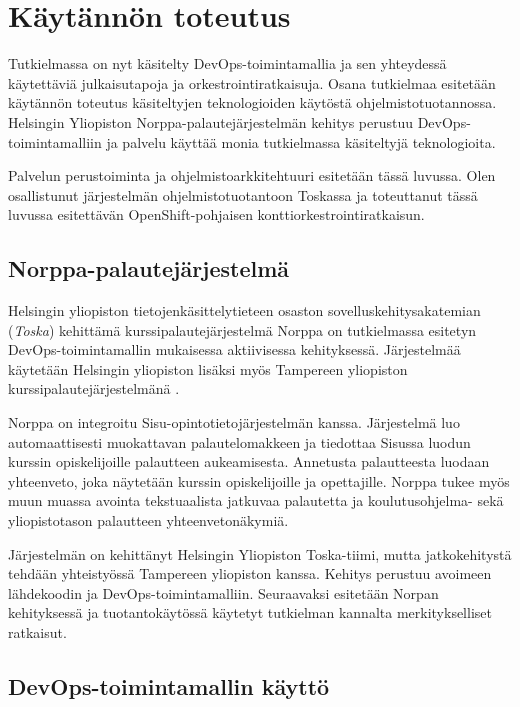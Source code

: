 \chapter{Käytännön toteutus\label{example}}

Tutkielmassa on nyt käsitelty DevOps-toimintamallia ja sen yhteydessä käytettäviä julkaisutapoja ja orkestrointiratkaisuja.
Osana tutkielmaa esitetään käytännön toteutus käsiteltyjen teknologioiden käytöstä ohjelmistotuotannossa.
Helsingin Yliopiston Norppa-palautejärjes\-telmän kehitys perustuu DevOps-toimintamalliin ja palvelu käyttää monia tutkielmassa käsiteltyjä teknologioita.

Palvelun perustoiminta ja ohjelmistoarkkitehtuuri esitetään tässä luvussa.
Olen osallistunut järjestelmän ohjelmistotuotantoon Toskassa ja toteuttanut tässä luvussa esitettävän OpenShift-pohjaisen konttiorkestrointiratkaisun.

\section{Norppa-palautejärjestelmä}

Helsingin yliopiston tietojenkäsittelytieteen osaston sovelluskehitysakatemian (\textit{Toska}) \cite{Tenhunen23} kehittämä kurssipalautejärjestelmä Norppa on tutkielmassa esitetyn DevOps-toimintamal\-lin mukaisessa aktiivisessa kehityksessä.
Järjestelmää käytetään Helsingin yliopiston lisäksi myös Tampereen yliopiston kurssipalautejärjestelmänä \cite{Tampere23}.

Norppa on integroitu Sisu-opintotietojärjestelmän \cite{Laukka20} kanssa.
Järjestelmä luo automaattisesti muokattavan palautelomakkeen ja tiedottaa Sisussa luodun kurssin opiskelijoille palautteen aukeamisesta.
Annetusta palautteesta luodaan yhteenveto, joka näytetään kurssin opiskelijoille ja opettajille.
Norppa tukee myös muun muassa avointa tekstuaalista jatkuvaa palautetta ja koulutusohjelma- sekä yliopistotason palautteen yhteenvetonäkymiä.

Järjestelmän on kehittänyt Helsingin Yliopiston Toska-tiimi, mutta jatkokehitystä tehdään yhteistyössä Tampereen yliopiston kanssa.
Kehitys perustuu avoimeen lähdekoodin ja DevOps-toimintamalliin.
Seuraavaksi esitetään Norpan kehityksessä ja tuotantokäytössä käytetyt tutkielman kannalta merkitykselliset ratkaisut.

\section{DevOps-toimintamallin käyttö}

